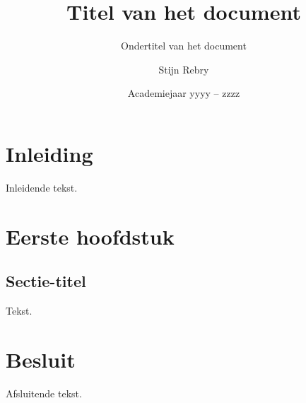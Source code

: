\documentclass[a4paper,twoside,kul]{kulakreport} %
\title{Titel van het document}
\subtitle{Ondertitel van het document}
\author{Stijn Rebry}
\institute{KU Leuven Kulak, Wetenschap \& Technologie}
\date{Academiejaar yyyy -- zzzz}
\begin{document}

\titlepage

\tableofcontents

\chapter*{Inleiding}
Inleidende tekst.

\chapter{Eerste hoofdstuk}
\section{Sectie-titel}
Tekst.

\chapter*{Besluit}
Afsluitende tekst.
\end{document}
